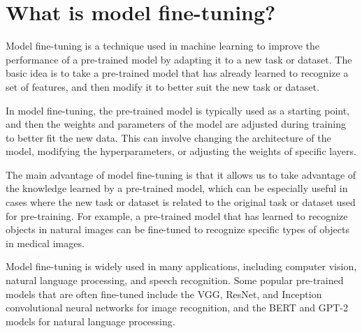 \section{What is model fine-tuning?}
Model fine-tuning is a technique used in machine learning to improve the performance of a pre-trained model by adapting it to a new task or dataset. The basic idea is to take a pre-trained model that has already learned to recognize a set of features, and then modify it to better suit the new task or dataset.

In model fine-tuning, the pre-trained model is typically used as a starting point, and then the weights and parameters of the model are adjusted during training to better fit the new data. This can involve changing the architecture of the model, modifying the hyperparameters, or adjusting the weights of specific layers.

The main advantage of model fine-tuning is that it allows us to take advantage of the knowledge learned by a pre-trained model, which can be especially useful in cases where the new task or dataset is related to the original task or dataset used for pre-training. For example, a pre-trained model that has learned to recognize objects in natural images can be fine-tuned to recognize specific types of objects in medical images.

Model fine-tuning is widely used in many applications, including computer vision, natural language processing, and speech recognition. Some popular pre-trained models that are often fine-tuned include the VGG, ResNet, and Inception convolutional neural networks for image recognition, and the BERT and GPT-2 models for natural language processing.

